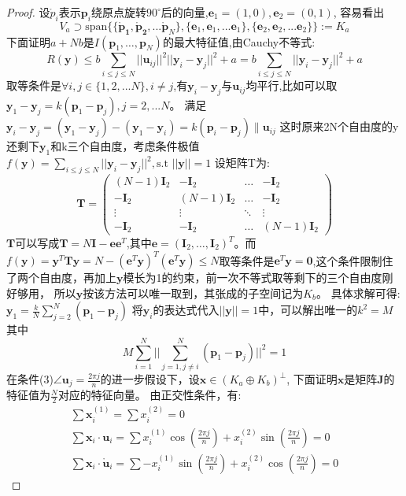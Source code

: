 \begin{proof}
设$\mathring{p}_i$表示$\bm{p}_i$绕原点旋转$90^{\circ}$后的向量,$\bm{e}_1=(1,0),\bm{e}_2=(0,1)$,
容易看出
\[
V_a \supset\text{span}\{\{\bm{\mathring{p}_1},\bm{\mathring{p}_2},...\bm{\mathring{p}} _N\},\{\bm{e}_1,\bm{e}_1,...\bm{e}_1\},\{\bm{e}_2,\bm{e}_2,...\bm{e}_2\}\}:=K_a
\]
下面证明$a+Nb$是$I(\bm{p}_1,\dots,\bm{p}_N)$的最大特征值,由Cauchy不等式:
\begin{equation}
R(\bm{y})\leq b\sum_{i\leq j\leq N} ||\bm{u}_{ij}||^2||\bm{y}_i-\bm{y}_j||^2+a=b\sum_{i\leq j\leq N}||\bm{y}_i-\bm{y}_j||^2+a
\end{equation}
取等条件是$\forall i,j\in \{1,2,...N\},i\neq j$,有$\bm{y}_i-\bm{y}_j$与$\bm{u}_{ij}$均平行,比如可以取
$\bm{y}_1-\bm{y}_j=k(\bm{p}_1-\bm{p}_j),j=2,...N$。
满足
$\bm{y}_i-\bm{y}_j=(\bm{y}_1-\bm{y}_j)-(\bm{y}_1-\bm{y}_i)
=k(\bm{p}_i-\bm{p}_j)\parallel \bm{u}_{ij}$
这时原来2N个自由度的y还剩下$\bm{y}_1$和k三个自由度，考虑条件极值
$f(\bm{y})=\sum_{i\leq j\leq N} ||\bm{y}_i-\bm{y}_j||^2,\text{s.t } ||\bm{y}||=1$
设矩阵T为:
\[
\bm{T}=\left(
\begin{array}{cccc}
(N-1)\bm{I}_2&-\bm{I}_2&\dots&-\bm{I}_2\\
-\bm{I}_2&(N-1)\bm{I}_2&\dots&-\bm{I}_2\\
\vdots & \vdots & \ddots & \vdots\\
-\bm{I}_2& -\bm{I}_2 & \dots & (N-1)\bm{I}_2
\end{array}
\right)
\]
$\bm{T}$可以写成$\bm{T}=N\bm{I}-\bm{e}\bm{e}^T$,其中$\bm{e}=(\bm{I}_2,\dots,\bm{I}_2)^T$。而$f(\bm{y})=\bm{y}^T\bm{T}\bm{y}=N-(\bm{e}^T\bm{y})^T(\bm{e}^T\bm{y})\leq N$取等条件是$\bm{e}^T\bm{y}=\bm{0}$,这个条件限制住了两个自由度，再加上$\bm{y}$模长为1的约束，前一次不等式取等剩下的三个自由度刚好够用，
所以$\bm{y}$按该方法可以唯一取到，其张成的子空间记为$K_b$。
具体求解可得:
$\bm{y}_1=\frac{k}{N}\sum_{j=2}^N (\bm{p}_1-\bm{p}_j)$
将$\bm{y}_i$的表达式代入$||\bm{y}||=1$中，可以解出唯一的$k^2=M$
其中
\[
M\sum_{i=1}^N||\sum_{j=1,j\neq i}^N(\bm{p}_1-\bm{p}_j)||^2=1
\]
  在条件(3)$\angle\bm{u}_j=\frac{2\pi j}{n}$的进一步假设下，设$\bm{x}\in (K_a\oplus K_b)^{\bot}$,
  下面证明$\bm{x}$是矩阵$\bm{J}$的特征值为$\frac{N}{2}$对应的特征向量。
  由正交性条件，有:
\begin{eqnarray}
\sum \bm{x}_i^{(1)}=\sum x_i^{(2)}=0\\
\sum \bm{x}_i \cdot \bm{u}_i=\sum x_i^{(1)} \cos(\frac{2\pi j}{n})+x_i^{(2)} \sin(\frac{2\pi j}{n}) =0\label{eq:coupling1}\\
\sum \bm{x}_i \cdot \mathring{\bm{u}}_i=\sum -x_i^{(1)} \sin(\frac{2\pi j}{n})+x_i^{(2)} \cos(\frac{2\pi j}{n}) =0\label{eq:coupling2}

\end{eqnarray}
\end{proof}
